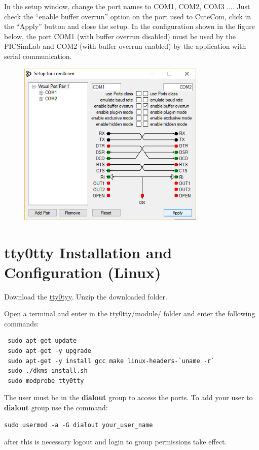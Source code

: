 In the setup window, change the port names to COM1, COM2, COM3 ....
Just check the ``enable buffer overrun'' option on the port used to CuteCom, click in the ``Apply''
button and close the setup.
In the configuration shown in the figure below, the port COM1 (with buffer overrun disabled) must be used by the PICSimLab and COM2 (with buffer overrun enabled) by the application with serial communication.
\begin{figure}[H]
\center
\includegraphics[width=0.8\textwidth]{img/com0com3.png} 
\end{figure} 
 
\section{tty0tty Installation and Configuration (Linux)}
 
Download the \href{https://github.com/lcgamboa/tty0tty/archive/master.zip}{tty0tyy}.
Unzip the downloaded folder.
 
Open a terminal and enter in the tty0tty/module/ folder and enter the following commands:
\begin{verbatim}
 sudo apt-get update
 sudo apt-get -y upgrade
 sudo apt-get -y install gcc make linux-headers-`uname -r` 
 sudo ./dkms-install.sh
 sudo modprobe tty0tty
\end{verbatim}

The user must be in the \textbf{dialout} group to access the ports. 
To add your user to \textbf{dialout} group use the command:
\begin{verbatim}
sudo usermod -a -G dialout your_user_name
\end{verbatim}
after this is necessary logout and login to group permissions take effect.


